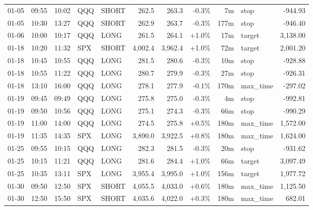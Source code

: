 \documentclass[11pt,a4paper,twoside]{article}
\begin{document}
\begin{center}
\begin{longtable}{>{\color{txtmain}}l l l l l r r r r >{\color{txtmain}}l r}
01-05 & 09:55 & 10:02 & QQQ & SHORT & 262.5 & 263.3 & \textcolor{lossred}{-0.3\%} & 7m & stop & \textcolor{lossred}{-944.93} \\
01-05 & 10:30 & 13:27 & QQQ & SHORT & 262.9 & 263.7 & \textcolor{lossred}{-0.3\%} & 177m & stop & \textcolor{lossred}{-946.40} \\
01-06 & 10:00 & 10:17 & QQQ & LONG & 261.5 & 264.1 & \textcolor{wingreen}{+1.0\%} & 17m & target & \textcolor{wingreen}{3,138.00} \\
01-18 & 10:20 & 11:32 & SPX & SHORT & 4,002.4 & 3,962.4 & \textcolor{wingreen}{+1.0\%} & 72m & target & \textcolor{wingreen}{2,001.20} \\
01-18 & 10:45 & 10:55 & QQQ & LONG & 281.5 & 280.6 & \textcolor{lossred}{-0.3\%} & 10m & stop & \textcolor{lossred}{-928.88} \\
01-18 & 10:55 & 11:22 & QQQ & LONG & 280.7 & 279.9 & \textcolor{lossred}{-0.3\%} & 27m & stop & \textcolor{lossred}{-926.31} \\
01-18 & 13:10 & 16:00 & QQQ & LONG & 278.1 & 277.9 & \textcolor{lossred}{-0.1\%} & 170m & max\_time & \textcolor{lossred}{-297.02} \\
01-19 & 09:45 & 09:49 & QQQ & LONG & 275.8 & 275.0 & \textcolor{lossred}{-0.3\%} & 4m & stop & \textcolor{lossred}{-992.81} \\
01-19 & 09:50 & 10:56 & QQQ & LONG & 275.1 & 274.3 & \textcolor{lossred}{-0.3\%} & 66m & stop & \textcolor{lossred}{-990.29} \\
01-19 & 11:00 & 14:00 & QQQ & LONG & 274.5 & 275.8 & \textcolor{wingreen}{+0.5\%} & 180m & max\_time & \textcolor{wingreen}{1,572.00} \\
01-19 & 11:35 & 14:35 & SPX & LONG & 3,890.0 & 3,922.5 & \textcolor{wingreen}{+0.8\%} & 180m & max\_time & \textcolor{wingreen}{1,624.00} \\
01-25 & 09:55 & 10:15 & QQQ & LONG & 282.3 & 281.5 & \textcolor{lossred}{-0.3\%} & 20m & stop & \textcolor{lossred}{-931.62} \\
01-25 & 10:15 & 11:21 & QQQ & LONG & 281.6 & 284.4 & \textcolor{wingreen}{+1.0\%} & 66m & target & \textcolor{wingreen}{3,097.49} \\
01-25 & 10:35 & 13:11 & SPX & LONG & 3,955.4 & 3,995.0 & \textcolor{wingreen}{+1.0\%} & 156m & target & \textcolor{wingreen}{1,977.72} \\
01-30 & 09:50 & 12:50 & SPX & SHORT & 4,055.5 & 4,033.0 & \textcolor{wingreen}{+0.6\%} & 180m & max\_time & \textcolor{wingreen}{1,125.50} \\
01-30 & 12:50 & 15:50 & SPX & SHORT & 4,035.6 & 4,022.0 & \textcolor{wingreen}{+0.3\%} & 180m & max\_time & \textcolor{wingreen}{682.01} \\

\end{longtable}
\end{center}
\end{document}
